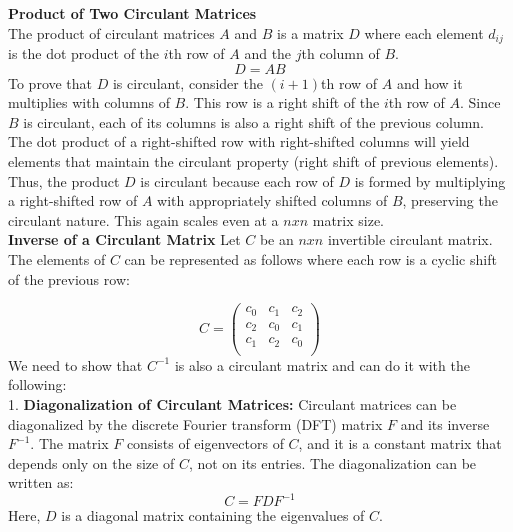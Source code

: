 \documentclass[8pt]{article}
\begin{document}
\textbf{Product of Two Circulant Matrices}\\
The product of circulant matrices \( A \) and \( B \) is a matrix \( D \) where each element \( d_{ij} \) is the dot product of the \( i \)th row of \( A \) and the \( j \)th column of \( B \).
\[ D = AB \]
To prove that \( D \) is circulant, consider the \( (i+1) \)th row of \( A \) and how it multiplies with columns of \( B \). This row is a right shift of the \( i \)th row of \( A \). Since \( B \) is circulant, each of its columns is also a right shift of the previous column. The dot product of a right-shifted row with right-shifted columns will yield elements that maintain the circulant property (right shift of previous elements).
Thus, the product \( D \) is circulant because each row of \( D \) is formed by multiplying a right-shifted row of \( A \) with appropriately shifted columns of \( B \), preserving the circulant nature. This again scales even at a $nxn$ matrix size.\\





\textbf{Inverse of a Circulant Matrix}
Let $C$ be an $n x n$ invertible circulant matrix. The elements of $C$ can be represented as follows where each row is a cyclic shift of the previous row:

\[
C=\begin{pmatrix}
c_0 & c_1 & c_2 \\
c_2 & c_0 & c_1 \\
c_1 & c_2 & c_0 \\
\end{pmatrix} \]
We need to show that \( C^{-1} \) is also a circulant matrix and can do it with the following:\\


1. \textbf{Diagonalization of Circulant Matrices:} Circulant matrices can be diagonalized by the discrete Fourier transform (DFT) matrix \( F \) and its inverse \( F^{-1} \). The matrix \( F \) consists of eigenvectors of \( C \), and it is a constant matrix that depends only on the size of \( C \), not on its entries. The diagonalization can be written as:
\[ C = FDF^{-1} \]
Here, \( D \) is a diagonal matrix containing the eigenvalues of \( C \). \\ 
\end{document}

